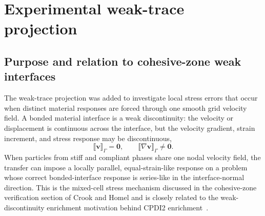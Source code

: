 \section{Experimental weak-trace projection}
\label{sec:weak-trace-implementation}

\noindent{}\par\medskip

\subsection{Purpose and relation to cohesive-zone weak interfaces}

The weak-trace projection was added to investigate local stress errors that occur when distinct material responses are forced through one smooth grid velocity field.  A bonded material interface is a weak discontinuity: the velocity or displacement is continuous across the interface, but the velocity gradient, strain increment, and stress response may be discontinuous,
\begin{equation}
  \llbracket \mathbf{v} \rrbracket_\Gamma = \mathbf{0},
  \qquad
  \llbracket \nabla \mathbf{v} \rrbracket_\Gamma \ne \mathbf{0}.
  \label{eq:weak-trace-weak-discontinuity}
\end{equation}
When particles from stiff and compliant phases share one nodal velocity field, the transfer can impose a locally parallel, equal-strain-like response on a problem whose correct bonded-interface response is series-like in the interface-normal direction.  This is the mixed-cell stress mechanism discussed in the cohesive-zone verification section of Crook and Homel and is closely related to the weak-discontinuity enrichment motivation behind CPDI2 enrichment~\cite{crook2025cohesive,sadeghirad2013cpdi2}.

